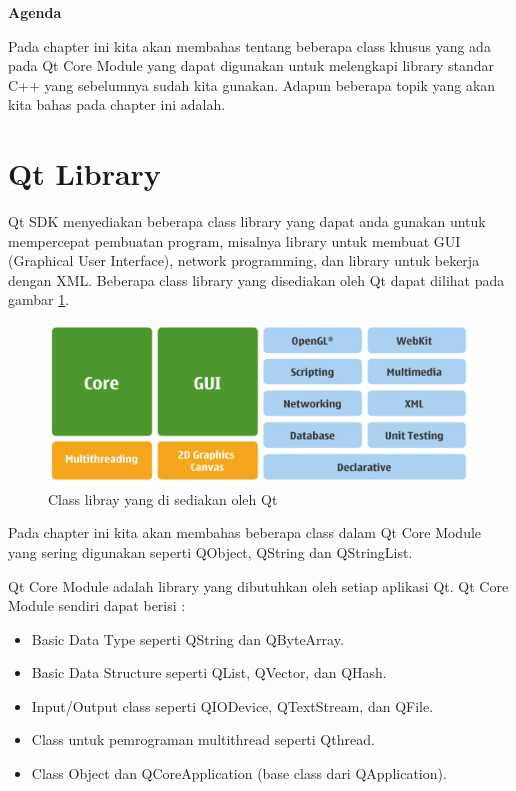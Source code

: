 \textbf{Agenda}

Pada chapter ini kita akan membahas tentang beberapa class khusus yang
ada pada Qt Core Module yang dapat digunakan untuk melengkapi library
standar C++ yang sebelumnya sudah kita gunakan. Adapun beberapa topik
yang akan kita bahas pada chapter ini adalah.

\minitoc

\section{Qt Library}\label{qt-library-1}

Qt SDK menyediakan beberapa class library yang dapat anda gunakan untuk
mempercepat pembuatan program, misalnya library untuk membuat GUI
(Graphical User Interface), network programming, dan library untuk
bekerja dengan XML. Beberapa class library yang disediakan oleh Qt dapat
dilihat pada gambar \ref{fig:qt-library}.

\begin{figure}[htbp]
\centering
\includegraphics[width=0.9\linewidth]{images/qt-library}
\caption{Class libray yang di sediakan oleh Qt}
\label{fig:qt-library}
\end{figure}


Pada chapter ini kita akan membahas beberapa class dalam Qt Core Module
yang sering digunakan seperti QObject, QString dan QStringList.

Qt Core Module adalah library yang dibutuhkan oleh setiap aplikasi Qt.
Qt Core Module sendiri dapat berisi :

\begin{itemize}

\item
  Basic Data Type seperti QString dan QByteArray.
\item
  Basic Data Structure seperti QList, QVector, dan QHash.
\item
  Input/Output class seperti QIODevice, QTextStream, dan QFile.
\item
  Class untuk pemrograman multithread seperti Qthread.
\item
  Class Object dan QCoreApplication (base class dari QApplication).
\end{itemize}

